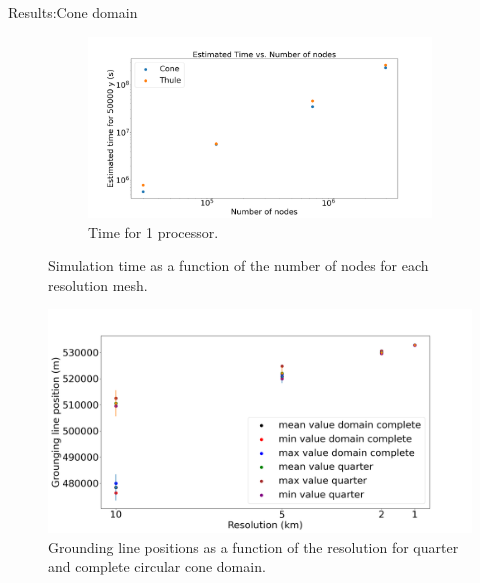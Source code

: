 \documentclass[11pt]{beamer}
\begin{document}
\begin{frame}[allowframebreaks]{Results:Cone domain}
\begin{figure}
\begin{subfigure}{.5\textwidth}
			\end{subfigure}%
			\begin{subfigure}{.5\textwidth}
				\centering
				\includegraphics[width=1.1\linewidth]{../fig/Figure_Time_vs_nodes_32.png}
				\caption{Time for 1 processor.}
				\label{1_proce}
			\end{subfigure}
			\caption{Simulation time as a function of the number of nodes for each resolution mesh.}
			\label{Computation time}
		\end{figure}
		\begin{figure}
			\centering
			\includegraphics[width=0.8\linewidth]{../fig/Figure_CONE_GL_positions.png}
			\caption{Grounding line positions as a function of the resolution for quarter and complete circular cone domain.}
			\label{Grounding_lines__CONE_comparison}
		\end{figure}
		
		\end{frame}
\end{document}
